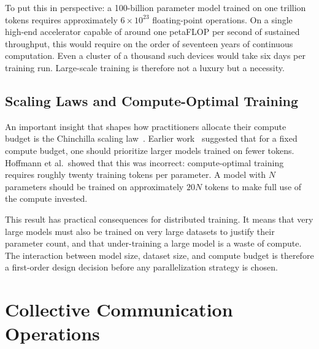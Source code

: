 \documentclass{book}
\begin{document}
To put this in perspective: a 100-billion parameter model trained on one
trillion tokens requires approximately $6 \times 10^{23}$ floating-point
operations. On a single high-end accelerator capable of around one petaFLOP
per second of sustained throughput, this would require on the order of
seventeen years of continuous computation. Even a cluster of a thousand
such devices would take six days per training run. Large-scale training is
therefore not a luxury but a necessity.

\subsection{Scaling Laws and Compute-Optimal Training}
\label{sec:scaling_laws}

An important insight that shapes how practitioners allocate their compute
budget is the Chinchilla scaling law~\cite{hoffmann2022training}. Earlier
work~\cite{kaplan2020scaling} suggested that for a fixed compute budget,
one should prioritize larger models trained on fewer tokens. Hoffmann et al.\
showed that this was incorrect: compute-optimal training requires roughly
twenty training tokens per parameter. A model with $N$ parameters should
be trained on approximately $20N$ tokens to make full use of the compute
invested.

This result has practical consequences for distributed training. It means
that very large models must also be trained on very large datasets to justify
their parameter count, and that under-training a large model is a waste of
compute. The interaction between model size, dataset size, and compute budget
is therefore a first-order design decision before any parallelization strategy
is chosen.


\section{Collective Communication Operations}
\label{sec:collective_comm}
\end{document}
